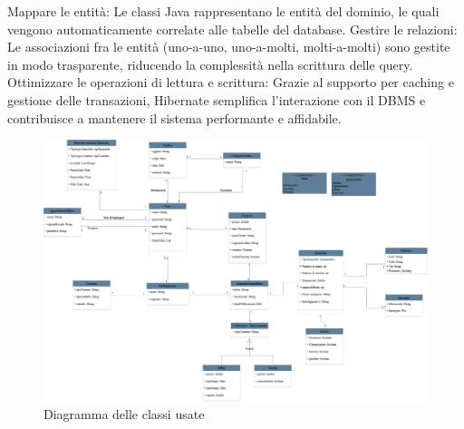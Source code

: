 Mappare le entità: Le classi Java rappresentano le entità del dominio, le quali vengono automaticamente correlate alle tabelle del database.
Gestire le relazioni: Le associazioni fra le entità (uno-a-uno, uno-a-molti, molti-a-molti) sono gestite in modo trasparente, riducendo la complessità nella scrittura delle query.
Ottimizzare le operazioni di lettura e scrittura: Grazie al supporto per caching e gestione delle transazioni, Hibernate semplifica l’interazione con il DBMS e contribuisce a mantenere il sistema performante e affidabile.
\newpage
\begin{figure}
    \centering
    \includegraphics[width=1
    \linewidth]{Immagini/diagramma delle classi.drawio.png}
    \caption{Diagramma delle classi usate}
    \label{fig:enter-label}
\end{figure}
